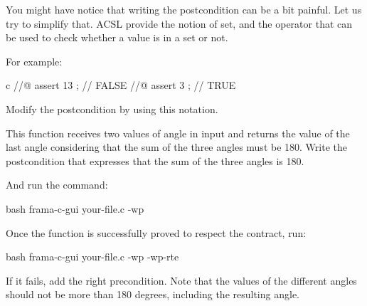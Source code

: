You might have notice that writing the postcondition can be a bit painful.
Let us try to simplify that. ACSL provide the notion of set, and the operator
 that can be used to check whether a value is
in a set or not.


For example:


\begin{CodeBlock}{c}
//@ assert 13  ; // FALSE
//@ assert 3   ; // TRUE
\end{CodeBlock}



Modify the postcondition by using this notation.






This function receives two values of angle in input and returns the value
of the last angle considering that the sum of the three angles must be 180.
Write the postcondition that expresses that the sum of the three angles is
180.





And run the command:


\begin{CodeBlock}{bash}
frama-c-gui your-file.c -wp
\end{CodeBlock}


Once the function is successfully proved to respect the contract, run:


\begin{CodeBlock}{bash}
frama-c-gui your-file.c -wp -wp-rte
\end{CodeBlock}



If it fails, add the right precondition. Note that the values of the different
angles should not be more than 180 degrees, including the resulting angle.
